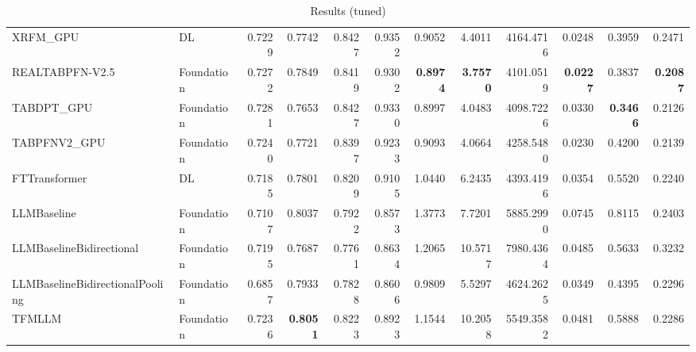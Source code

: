 \begin{table}[htbp]
{\begin{tabular}{ll|rrrrrrrrrr}
XRFM\_GPU & DL & 0.7229 & 0.7742 & 0.8427 & 0.9352 & 0.9052 & 4.4011 & 4164.4716 & 0.0248 & 0.3959 & 0.2471 \\
REALTABPFN-V2.5 & Foundation & 0.7272 & 0.7849 & 0.8419 & 0.9302 & \textbf{0.8974} & \textbf{3.7570} & 4101.0519 & \textbf{0.0227} & 0.3837 & \textbf{0.2087} \\
TABDPT\_GPU & Foundation & 0.7281 & 0.7653 & 0.8427 & 0.9330 & 0.8997 & 4.0483 & 4098.7226 & 0.0330 & \textbf{0.3466} & 0.2126 \\
TABPFNV2\_GPU & Foundation & 0.7240 & 0.7721 & 0.8397 & 0.9233 & 0.9093 & 4.0664 & 4258.5480 & 0.0230 & 0.4200 & 0.2139 \\
\midrule
FTTransformer & DL & 0.7185 & 0.7801 & 0.8209 & 0.9105 & 1.0440 & 6.2435 & 4393.4196 & 0.0354 & 0.5520 & 0.2240 \\
LLMBaseline & Foundation & 0.7107 & 0.8037 & 0.7922 & 0.8573 & 1.3773 & 7.7201 & 5885.2990 & 0.0745 & 0.8115 & 0.2403 \\
LLMBaselineBidirectional & Foundation & 0.7195 & 0.7687 & 0.7761 & 0.8634 & 1.2065 & 10.5717 & 7980.4364 & 0.0485 & 0.5633 & 0.3232 \\
LLMBaselineBidirectionalPooling & Foundation & 0.6857 & 0.7933 & 0.7828 & 0.8606 & 0.9809 & 5.5297 & 4624.2625 & 0.0349 & 0.4395 & 0.2296 \\
TFMLLM & Foundation & 0.7236 & \textbf{0.8051} & 0.8223 & 0.8923 & 1.1544 & 10.2058 & 5549.3582 & 0.0481 & 0.5888 & 0.2286 \\
\bottomrule
\end{tabular}
}
\caption{Results (tuned)}
\label{tab:results_tuned}
\end{table}